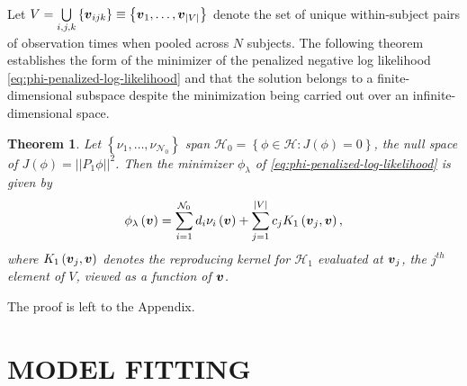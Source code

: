 \documentclass[12pt]{article}
\newcommand{\hilbert}{\mathcal{H}}
\newcommand{\bfv}{\mbox{\boldmath $v$}}
\newtheorem{theorem}{Theorem}[section]
\begin{document}
Let $V = \bigcup\limits_{i,j,k} \left\{\bfv_{ijk} \right\} \equiv \left\{ \bfv_1,\dots,\bfv_{\vert V \vert} \right\}$ denote the set of unique within-subject pairs of observation times when pooled across $N$ subjects. The following theorem establishes the form of the minimizer of the penalized negative log likelihood \eqref{eq:phi-penalized-log-likelihood} and that the solution belongs to a finite-dimensional subspace despite the minimization being carried out over an infinite-dimensional space.
 \begin{theorem} \label{theorem:finite-dimensional-minimizer}
 Let $\left\{\nu_1,\dots, \nu_{\mathcal{N}_0}\right\}$ span $\hilbert_0 = \left\{\phi \in \hilbert: J\left(\phi\right) = 0\right\}$, the null space of $J\left(\phi\right) = \vert \vert P_1 \phi\vert\vert^2$. Then the minimizer $\phi_\lambda$ of \eqref{eq:phi-penalized-log-likelihood} is given by
 \begin{equation} \label{eq:form-of-the-minimizer-phi}
\phi_\lambda\left(\bfv\right) = \sum_{i = 1}^{\mathcal{N}_0} d_i \nu_{i}\left(\bfv\right) + \sum_{j = 1}^{\vert V \vert} c_j K_1\left(\bfv_j, \bfv\right),
\end{equation}
\noindent
where $K_1\left(\bfv_j, \bfv \right)$ denotes the reproducing kernel for $\hilbert_1$ evaluated at ${\bfv_j}$, the $j^{th}$ element of $V$, viewed as a function of $\bfv$.
\end{theorem}
\noindent
The proof is left to the Appendix.


\section*{\sffamily \normalsize MODEL FITTING}
\end{document}
